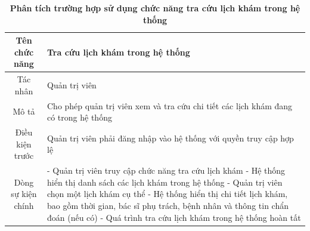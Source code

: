 \begin{table}[H]
	\caption{\bfseries \fontsize{12pt}{0pt}\selectfont Phân tích trường hợp sử dụng chức năng tra cứu lịch khám trong hệ thống}
	\centering
	\begin{tabularx}{0.9\textwidth}{|c|X|}
		\hline
		\textbf{Tên chức năng} & \textbf{Tra cứu lịch khám trong hệ thống}                                           \\
		\hline
		Tác nhân               & Quản trị viên                                                                       \\
		\hline
		Mô tả                  & Cho phép quản trị viên xem và tra cứu chi tiết các lịch khám đang có trong hệ thống \\
		\hline
		Điều kiện trước        & Quản trị viên phải đăng nhập vào hệ thống với quyền truy cập hợp lệ                 \\
		\hline
		Dòng sự kiện chính     &
		- Quản trị viên truy cập chức năng tra cứu lịch khám \newline
		- Hệ thống hiển thị danh sách các lịch khám trong hệ thống \newline
		- Quản trị viên chọn một lịch khám cụ thể \newline
		- Hệ thống hiển thị chi tiết lịch khám, bao gồm thời gian, bác sĩ phụ trách, bệnh nhân và thông tin chẩn đoán (nếu có) \newline
		- Quá trình tra cứu lịch khám trong hệ thống hoàn tất                                                        \\
		\hline
	\end{tabularx}
\end{table}


